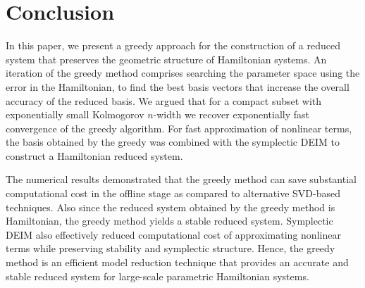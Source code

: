\section{Conclusion} \label{chap:Con:1}

In this paper, we present a greedy approach for the construction of a reduced system that preserves the geometric structure of Hamiltonian systems. An iteration of the greedy method comprises searching the parameter space using the error in the Hamiltonian, to find the best basis vectors that increase the overall accuracy of the reduced basis. We argued that for a compact subset with exponentially small Kolmogorov $n$-width we recover exponentially fast convergence of the greedy algorithm. For fast approximation of nonlinear terms, the basis obtained by the greedy was combined with the symplectic DEIM to construct a Hamiltonian reduced system.




The numerical results demonstrated that the greedy method can save substantial computational cost in the offline stage as compared to alternative SVD-based techniques. Also since the reduced system obtained by the greedy method is Hamiltonian, the greedy method yields a stable reduced system. Symplectic DEIM also effectively reduced computational cost of approximating nonlinear terms while preserving stability and symplectic structure. Hence, the greedy method is an efficient model reduction technique that provides an accurate and stable reduced system for large-scale parametric Hamiltonian systems.


